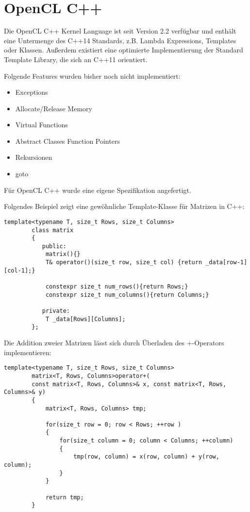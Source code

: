 		
		\section{OpenCL C++}\label{OCLC++}
		Die OpenCL C++ \Gls{Kernel} Language ist seit Version 2.2 verfügbar und enthält eine Untermenge des C++14 Standards, z.B. Lambda Expressions, Templates oder Klassen. Außerdem existiert eine optimierte Implementierung der Standard Template Library, die sich an C++11 orientiert. 
		
		Folgende Features wurden bisher noch nicht implementiert:
		\begin{itemize}
			\item Exceptions
			\item Allocate/Release Memory
			\item Virtual Functions 
			\item Abstract Classes Function Pointers
			\item Rekursionen 
			\item goto
		\end{itemize}
		
		Für OpenCL C++ wurde eine eigene Spezifikation angefertigt. \autocite{oclC++Spec}
		
		Folgendes Beispiel zeigt eine gewöhnliche Template-Klasse für Matrizen in C++:
		\begin{lstlisting}[caption=~Matrix OpenCl C++]
		template<typename T, size_t Rows, size_t Columns>
		class matrix 
		{
		   public:
			matrix(){}
			T& operator()(size_t row, size_t col) {return _data[row-1][col-1];}

			constexpr size_t num_rows(){return Rows;}
			constexpr size_t num_columns(){return Columns;}
			
		   private:
			T _data[Rows][Columns];
		};
		\end{lstlisting}
		
		Die Addition zweier Matrizen lässt sich durch Überladen des $+$-Operators implementieren:
		\begin{lstlisting}[caption=~Matrixaddition OpenCl C++]
		template<typename T, size_t Rows, size_t Columns> 
		matrix<T, Rows, Columns>operator+(
		const matrix<T, Rows, Columns>& x, const matrix<T, Rows, Columns>& y) 
		{
			matrix<T, Rows, Columns> tmp;
			
			for(size_t row = 0; row < Rows; ++row ) 
			{
				for(size_t column = 0; column < Columns; ++column) 
				{
					tmp(row, column) = x(row, column) + y(row, column);
				}
			}
			
			return tmp;
		}
		\end{lstlisting}
		
